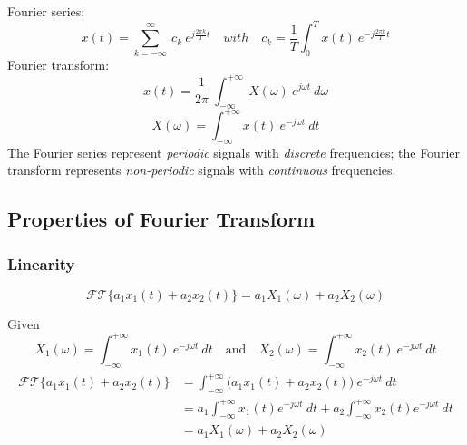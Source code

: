 \begin{tcolorbox}[title=Compare Fourier series and Fourier transform, breakable]
    Fourier series:
    \[ 
    x(t) =  \sum_{k=-\infty}^{\infty} \ c_{k} \ e^{j\frac{2\pi k}{T}t} \quad with \quad c_{k} = \frac{1}{T} \int_{0}^{T} x(t) \ e^{-j\frac{2\pi k}{T}t} 
    \]
    Fourier transform:
    \[ 
    x(t) = \frac{1}{2 \pi} \ \int_{-\infty}^{+\infty} \ X( \omega) \ e^{j \omega t} \ d\omega 
    \]
    \[ 
    X(\omega) =  \int_{-\infty}^{+\infty} x(t) \ e^{-j \omega t} \ dt 
    \]
    The Fourier series represent \textit{periodic} signals with \textit{discrete} frequencies; the Fourier transform represents \textit{non-periodic} signals with \textit{continuous} frequencies.
\end{tcolorbox}

\subsection{Properties of Fourier Transform}

\subsubsection{Linearity}
\[ \mathcal{FT} \{ a_{1}x_{1}(t)+a_{2}x_{2}(t)\} = a_{1}X_{1}(\omega)+a_{2}X_{2}(\omega) \]
\begin{dv}{}
    Given
    \[ 
    X_{1}(\omega) =  \int_{-\infty}^{+\infty} x_{1}(t) \ e^{-j \omega t} \ dt \quad \text{and} \quad X_{2}(\omega) =  \int_{-\infty}^{+\infty} x_{2}(t) \ e^{-j \omega t} \ dt 
    \]
    \begin{align*}
    \begin{split}
        \mathcal{FT} \{ a_{1}x_{1}(t)+a_{2}x_{2}(t) \} 
        &= \int_{-\infty}^{+\infty} \big( a_{1}x_{1}(t)+a_{2}x_{2}(t)\big) \ e^{-j \omega t} \ dt  \\
        &= a_{1}\int_{-\infty}^{+\infty}x_{1}(t)e^{-j \omega t} \ dt + a_{2}\int_{-\infty}^{+\infty}x_{2}(t) e^{-j \omega t} \ dt \\
        &= a_{1}X_{1}(\omega)+a_{2}X_{2}(\omega)
    \end{split} 
    \end{align*} 
\end{dv}

